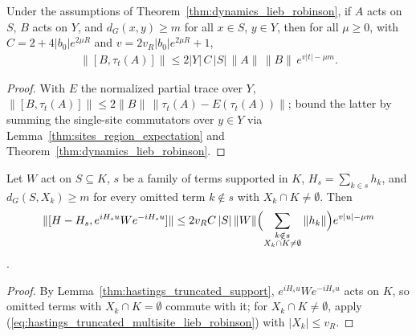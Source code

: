 \begin{lemma}
    \label{thm:hastings_truncated_multisite_lieb_robinson}
    \leanok
    Under the assumptions of Theorem~\ref{thm:dynamics_lieb_robinson}, if
    $A$ acts on $S$, $B$ acts on $Y$, and $d_G(x,y)\ge m$ for all $x\in S$,
    $y\in Y$, then for all $\mu\ge0$, with $C=2+4|b_0|e^{2\mu R}$ and
    $v=2v_R|b_0|e^{2\mu R}+1$,
    \begin{align}
        \|[B,\tau_t(A)]\|\le2|Y|\,C\,|S|\,\|A\|\,\|B\|\,e^{v|t|-\mu m}.
        \label{eq:hastings_truncated_multisite_lieb_robinson}
    \end{align}
\end{lemma}
\begin{proof}
    \leanok
    With $E$ the normalized partial trace over $Y$,
    $\|[B,\tau_t(A)]\|\le2\|B\|\,\|\tau_t(A)-E(\tau_t(A))\|$; bound the latter
    by summing the single-site commutators over $y\in Y$ via
    Lemma~\ref{thm:sites_region_expectation} and
    Theorem~\ref{thm:dynamics_lieb_robinson}.
\end{proof}

\begin{lemma}
    \label{thm:hastings_truncated_omitted_commutator}
    \leanok
    Let $W$ act on $S\subseteq K$, $s$ be a family of terms supported in $K$,
    $H_s=\sum_{k\in s}h_k$, and $d_G(S,X_k)\ge m$ for every omitted term
    $k\notin s$ with $X_k\cap K\ne\emptyset$. Then
    \begin{align}
        \|[H-H_s,e^{iH_su}We^{-iH_su}]\|
        \le2v_RC\,|S|\,\|W\|\Bigl(\sum_{\substack{k\notin s \\ X_k\cap K\ne\emptyset}}\|h_k\|\Bigr)e^{v|u|-\mu m}
        \label{eq:hastings_truncated_omitted_commutator}
    \end{align}
    \cite[lines 1469--1505]{Hastings2006Solving}.
\end{lemma}
\begin{proof}
    \leanok
    By Lemma~\ref{thm:hastings_truncated_support}, $e^{iH_su}We^{-iH_su}$ acts
    on $K$, so omitted terms with $X_k\cap K=\emptyset$ commute with it; for
    $X_k\cap K\ne\emptyset$, apply
    (\ref{eq:hastings_truncated_multisite_lieb_robinson}) with $|X_k|\le v_R$.
\end{proof}

